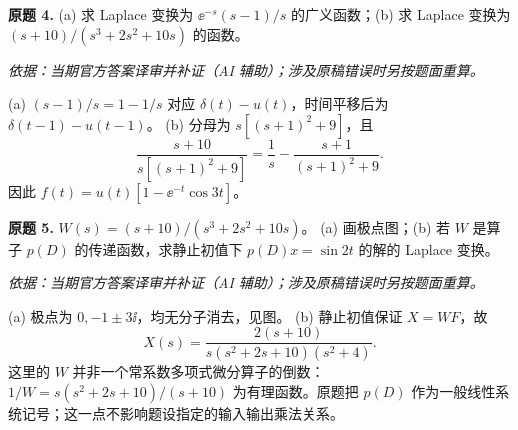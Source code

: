 \begin{exercise}\label{cw:ex3-4}\textbf{原题 4.}
(a) 求 Laplace 变换为 $\ee^{-s}(s-1)/s$ 的广义函数；(b) 求 Laplace 变换为 $(s+10)/(s^3+2s^2+10s)$ 的函数。
\end{exercise}
\begin{solution}
\textit{依据：当期官方答案译审并补证（AI 辅助）；涉及原稿错误时另按题面重算。}\par
(a) $(s-1)/s=1-1/s$ 对应 $\delta(t)-u(t)$，时间平移后为 $\delta(t-1)-u(t-1)$。
(b) 分母为 $s[(s+1)^2+9]$，且
\[\frac{s+10}{s[(s+1)^2+9]}=\frac1s-\frac{s+1}{(s+1)^2+9}.\]
因此 $f(t)=u(t)[1-\ee^{-t}\cos3t]$。
\end{solution}
\begin{exercise}\label{cw:ex3-5}\textbf{原题 5.} $W(s)=(s+10)/(s^3+2s^2+10s)$。
(a) 画极点图；(b) 若 $W$ 是算子 $p(D)$ 的传递函数，求静止初值下 $p(D)x=\sin2t$ 的解的 Laplace 变换。
\end{exercise}
\begin{solution}
\textit{依据：当期官方答案译审并补证（AI 辅助）；涉及原稿错误时另按题面重算。}\par
(a) 极点为 $0,-1\pm3\ii$，均无分子消去，见图。
(b) 静止初值保证 $X=WF$，故
\[X(s)=\frac{2(s+10)}{s(s^2+2s+10)(s^2+4)}.\]
这里的 $W$ 并非一个常系数多项式微分算子的倒数：$1/W=s(s^2+2s+10)/(s+10)$ 为有理函数。原题把 $p(D)$ 作为一般线性系统记号；这一点不影响题设指定的输入输出乘法关系。
\end{solution}

